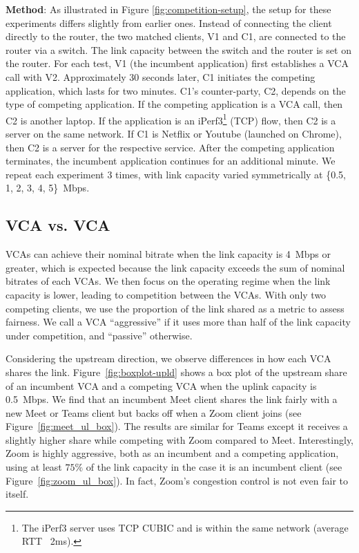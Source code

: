 \noindent \textbf{Method}: As illustrated in Figure \ref{fig:competition-setup}, the setup for these experiments differs slightly from earlier ones. 
Instead of connecting the client directly to the router, the two matched clients, V1 and C1, are connected to the router via a switch. 
The link capacity between the switch and the router is set on the router. For each test, V1 (the incumbent application) first establishes a VCA call with V2.
Approximately 30 seconds later, C1 initiates the competing application, which lasts for two minutes.
C1's counter-party, C2, depends on the type of competing application.
If the competing application is a VCA call, then C2 is another laptop.
If the application is an iPerf3\footnote{The iPerf3 server uses TCP CUBIC and is  within the same network (average RTT ~2ms).} (TCP) flow, then C2 is a server on the same network.
  If C1 is Netflix or Youtube (launched on Chrome), then C2 is a server for the respective service. 
After the competing application terminates, the incumbent application continues for an additional minute.
We repeat each experiment 3 times, with link capacity varied symmetrically at \{0.5, 1, 2, 3, 4, 5\}~Mbps.

\subsection{VCA vs. VCA}

VCAs can achieve their nominal bitrate when the link capacity is
4~Mbps or greater, which is expected because the link capacity exceeds the sum of
nominal bitrates of each VCAs. We then focus on the operating regime when the link
capacity is lower, leading to competition between the VCAs. 
With only two competing clients, we use the proportion of the link shared as a
metric to assess fairness. We call a VCA ``aggressive'' if it uses more than
half of the link capacity under competition, and ``passive'' otherwise.

Considering the upstream direction, we observe differences in how each VCA shares the
link. Figure~\ref{fig:boxplot-upld} shows a box plot of the upstream share of
an incumbent VCA and a competing VCA when the uplink capacity is 0.5~Mbps.  We
find that an incumbent Meet client shares the link fairly with a new Meet or
Teams client but backs off when a Zoom client joins (see
Figure~\ref{fig:meet_ul_box}). The results are similar for Teams except it
receives a slightly higher share while competing with Zoom compared to Meet.
Interestingly, Zoom is highly aggressive, both as an incumbent and a competing
application, using at least $75\%$ of the link capacity in the case it is an
incumbent client (see Figure~\ref{fig:zoom_ul_box}). In fact, Zoom's
congestion control is not even fair to itself.

